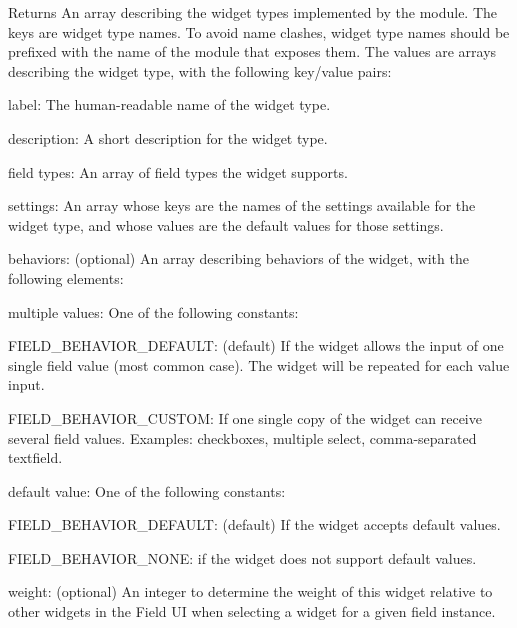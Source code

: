 \begin{DoxyReturn}{Returns}
An array describing the widget types implemented by the module. The keys are widget type names. To avoid name clashes, widget type names should be prefixed with the name of the module that exposes them. The values are arrays describing the widget type, with the following key/value pairs:
\begin{DoxyItemize}
\item label: The human-\/readable name of the widget type.
\item description: A short description for the widget type.
\item field types: An array of field types the widget supports.
\item settings: An array whose keys are the names of the settings available for the widget type, and whose values are the default values for those settings.
\item behaviors: (optional) An array describing behaviors of the widget, with the following elements:
\begin{DoxyItemize}
\item multiple values: One of the following constants:
\begin{DoxyItemize}
\item FIELD\_\-BEHAVIOR\_\-DEFAULT: (default) If the widget allows the input of one single field value (most common case). The widget will be repeated for each value input.
\item FIELD\_\-BEHAVIOR\_\-CUSTOM: If one single copy of the widget can receive several field values. Examples: checkboxes, multiple select, comma-\/separated textfield.
\end{DoxyItemize}
\item default value: One of the following constants:
\begin{DoxyItemize}
\item FIELD\_\-BEHAVIOR\_\-DEFAULT: (default) If the widget accepts default values.
\item FIELD\_\-BEHAVIOR\_\-NONE: if the widget does not support default values.
\end{DoxyItemize}
\end{DoxyItemize}
\item weight: (optional) An integer to determine the weight of this widget relative to other widgets in the Field UI when selecting a widget for a given field instance.
\end{DoxyItemize}
\end{DoxyReturn}
